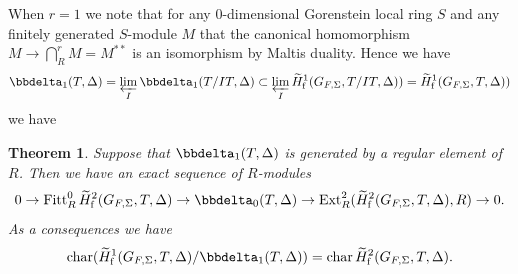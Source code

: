 \documentclass[10pt]{amsart}
\numberwithin{equation}{section}
\newtheorem{thm}{Theorem}[section]
\theoremstyle{definition}
\theoremstyle{remark} %
\DeclareMathOperator{\Char}{char}
\newcommand{\Ext}{\operatorname{Ext}}
\newcommand{\Fitt}{\operatorname{Fitt}}
\begin{document}
		\subsubsection{}
		When $r=1$ we note that for any $0$-dimensional Gorenstein local ring $S$ and any finitely generated $S$-module $M$ that the canonical homomorphism $M \rightarrow \bigcap^r_R M= M^{**}$ is an isomorphism by Maltis duality. Hence we have 
		$$ \bbdelta_1(T,\Delta) = \varprojlim_I \bbdelta_1(T/IT,\Delta) \subset \varprojlim_I \widetilde{H}^1_{\mathrm{f}}(G_{F,\Sigma},T/IT,\Delta)) =\widetilde{H}^1_{\mathrm{f}}(G_{F,\Sigma},T,\Delta)) $$ we have 
		\begin{thm}
			\label{leading_term_rank1}
			Suppose that $ \bbdelta_1(T, \Delta)  $ is generated by a regular element of $ R $. Then we have an exact sequence of $ R $-modules
			$$ 	0 \rightarrow \Fitt^0_R \widetilde{H}^2_{\mathrm{f}}(G_{F,\Sigma},T,\Delta) \rightarrow \bbdelta_0(T, \Delta) \rightarrow \Ext^2_R(\widetilde{H}^2_{\mathrm{f}}(G_{F,\Sigma},T,\Delta),R) \rightarrow 0 .$$
			As a consequences we have $$\Char(\widetilde{H}^1_{\mathrm{f}}(G_{F,\Sigma},T,\Delta)/\bbdelta_1(T,\Delta)) =  \Char\widetilde{H}^2_{\mathrm{f}}(G_{F,\Sigma},T,\Delta).$$	
		\end{thm}
\end{document}
